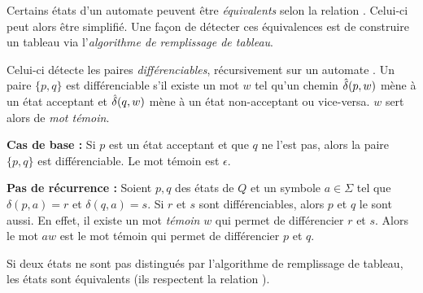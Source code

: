 	 Certains états d'un automate peuvent être \emph{équivalents} selon la relation \rm. Celui-ci peut alors être simplifié. Une façon de détecter ces équivalences est de construire un tableau via l'\emph{algorithme de remplissage de tableau}.
	 
	 Celui-ci détecte les paires \emph{différenciables}, récursivement sur un automate \automaton. Un paire $\{p,q\}$ est différenciable s'il existe un mot $w$ tel qu'un chemin $\hat{\delta}(p,w)$ mène à un état acceptant et $\hat{\delta}(q,w)$ mène à un état non-acceptant ou vice-versa. $w$ sert alors de \emph{mot témoin}.
	 
	 
	 \textbf{Cas de base :} Si $p$ est un état acceptant et que $q$ ne l'est pas, alors la paire $\{p,q\}$ est différenciable. Le mot témoin est $\epsilon$.
	 
	 \textbf{Pas de récurrence : } Soient $p,q$ des états de $Q$ et un symbole $a \in \Sigma$ tel que $\delta(p,a)=r$ et $\delta(q,a)=s$. Si $r$ et $s$ sont différenciables, alors $p$ et $q$ le sont aussi. En effet, il existe un mot \emph{témoin} $w$ qui permet de différencier $r$ et $s$. Alors le mot $aw$ est le mot témoin qui permet de différencier $p$ et $q$.
	 
	 \begin{theorem}
	 	Si deux états ne sont pas distingués par l'algorithme de remplissage de tableau, les états sont équivalents (ils respectent la relation \rm).
	 \end{theorem}
	 
